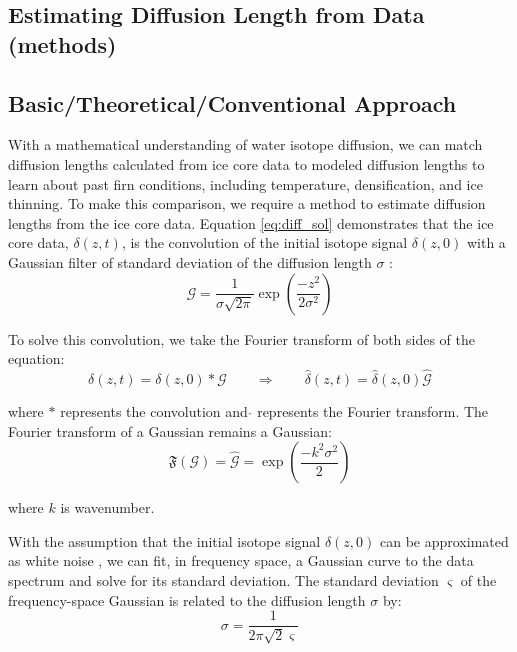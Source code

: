 \documentclass[draft, jgrga]{AGUTeX}
\begin{document}
\begin{article}

\section{Estimating Diffusion Length from Data (methods)}
\subsection{Basic/Theoretical/Conventional Approach}

With a mathematical understanding of water isotope diffusion, we can match diffusion lengths calculated from ice core data to modeled diffusion lengths to learn about past firn conditions, including temperature, densification, and ice thinning. To make this comparison, we require a method to estimate diffusion lengths from the ice core data. Equation \ref{eq:diff_sol} demonstrates that the ice core data, $\delta(z,t)$, is the convolution of the initial isotope signal $\delta(z,0)$ with a Gaussian filter of standard deviation of the diffusion length $\sigma$ \citep{Johnsen2000}:
\begin{equation}
\mathcal{G} = \frac{1}{\sigma \sqrt{2\pi}} \exp \left( \frac{-z^2}{2\sigma^2} \right)
\end{equation}

To solve this convolution, we take the Fourier transform of both sides of the equation:
\begin{equation}
  \delta(z,t) = \delta(z,0)*\mathcal{G} \qquad \Rightarrow \qquad \hat{\delta}(z,t) = \hat{\delta}(z,0)\hat{\mathcal{G}}
\end{equation}

where $*$ represents the convolution and \quad $\hat{}$ \quad represents the Fourier transform. The Fourier transform of a Gaussian remains a Gaussian:
\begin{equation}
\mathfrak{F}(\mathcal{G}) = \hat{\mathcal{G}} = \exp \left( \frac{-k^2\sigma^2}{2} \right)
\end{equation}

where $k$ is wavenumber.

With the assumption that the initial isotope signal $\delta(z,0)$ can be approximated as white noise \citep{Gkinis2014}, we can fit, in frequency space, a Gaussian curve to the data spectrum and solve for its standard deviation. The standard deviation $\varsigma$ of the frequency-space Gaussian is related to the diffusion length $\sigma$ by:
\begin{equation}
  \sigma = \frac{1}{2\pi\sqrt{2}\varsigma}
\end{equation}


\end{article}
\end{document}
